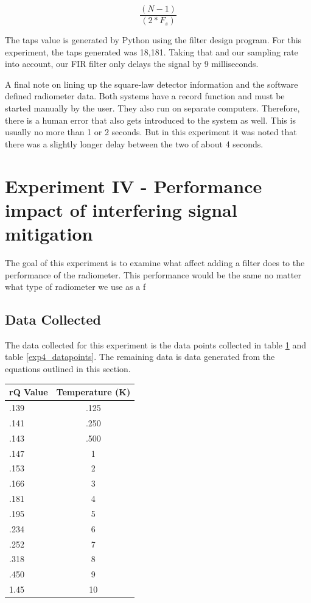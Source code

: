 {\begin{equation}\label{FIR_delay}
\frac{(N - 1)}{(2*F_{s})}
\end{equation}

The taps value is generated by Python using the filter design program.  For this experiment, the taps generated was 18,181.  Taking that and our sampling rate into account, our FIR filter only delays the signal by 9 milliseconds.  

A final note on lining up the square-law detector information and the software defined radiometer data.  Both systems have a record function and must be started manually by the user.  They also run on separate computers.  Therefore, there is a human error that also gets introduced to the system as well.  This is usually no more than 1 or 2 seconds.  But in this experiment it was noted that there was a slightly longer delay between the two of about 4 seconds.  

\section{Experiment IV - Performance impact of interfering signal mitigation} \label{Exp4_results}
The goal of this experiment is to examine what affect adding a filter does to the performance of the radiometer.  This performance would be the same no matter what type of radiometer we use as a f

\subsection{Data Collected}
The data collected for this experiment is the data points collected in table \ref{exp4_data_power} and table \ref{exp4_datapoints}.  The remaining data is data generated from the equations outlined in this section.

\begin{table}[h!tb] \centering
{}
\label{exp4_data_power}
\begin{tabular}{lc} \hline
\textbf{rQ Value} & \textbf{Temperature (K)} \\ \hline
.139 & .125 \\
.141 & .250 \\
.143 & .500 \\
.147 & 1 \\
.153 & 2 \\
.166 & 3 \\
.181 & 4 \\
.195 & 5 \\
.234 & 6 \\
.252 & 7 \\
.318 & 8 \\
.450 & 9 \\
1.45 & 10 \\ \hline
\end{tabular}
\end{table}

}
